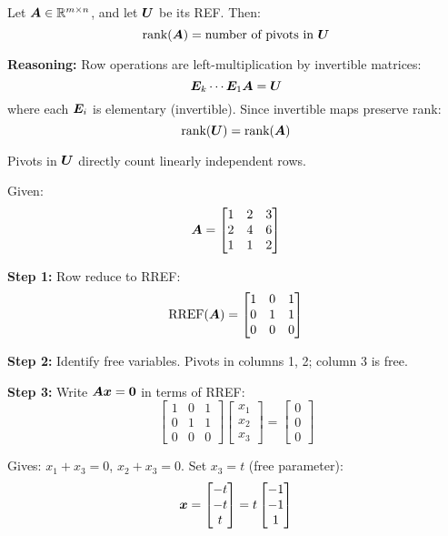 \begin{theorem}
    \label{thm:row-reduction-rank}
    Let $\bm{A} \in \mathbb{R}^{m \times n}$, and let $\bm{U}$ be its REF. Then:
    \[
        \text{rank}(\bm{A}) = \text{number of pivots in } \bm{U}
    \]

    \textbf{Reasoning:} Row operations are left-multiplication by invertible matrices:
    \[
        \bm{E}_k \cdots \bm{E}_1 \bm{A} = \bm{U}
    \]
    where each $\bm{E}_i$ is elementary (invertible). Since invertible maps
    preserve rank:
    \[
        \text{rank}(\bm{U}) = \text{rank}(\bm{A})
    \]

    Pivots in $\bm{U}$ directly count linearly independent rows.
\end{theorem}

\begin{example}
    Given:
    \[
        \bm{A} = \begin{bmatrix} 1 & 2 & 3 \\ 2 & 4 & 6 \\ 1 & 1 & 2 \end{bmatrix}
    \]

    \textbf{Step 1:} Row reduce to RREF:
    \[
        \text{RREF}(\bm{A}) = \begin{bmatrix} 1 & 0 & 1 \\ 0 & 1 & 1 \\ 0 & 0 & 0 \end{bmatrix}
    \]

    \textbf{Step 2:} Identify free variables. Pivots in columns 1, 2; column 3 is free.

    \textbf{Step 3:} Write $\bm{A}\bm{x} = \bm{0}$ in terms of RREF:
    \[
        \begin{bmatrix} 1 & 0 & 1 \\ 0 & 1 & 1 \\ 0 & 0 & 0 \end{bmatrix} \begin{bmatrix} x_1 \\ x_2 \\ x_3 \end{bmatrix} = \begin{bmatrix} 0 \\ 0 \\ 0 \end{bmatrix}
    \]

    Gives: $x_1 + x_3 = 0$, $x_2 + x_3 = 0$. Set $x_3 = t$ (free parameter):
    \[
        \bm{x} = \begin{bmatrix} -t \\ -t \\ t \end{bmatrix} = t \begin{bmatrix} -1 \\ -1 \\ 1 \end{bmatrix}
    \]


\end{example}
